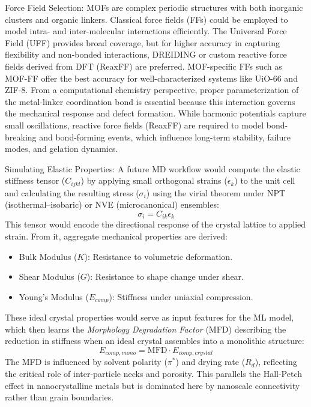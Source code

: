 \documentclass[12pt,a4paper]{article}
\begin{document}
Force Field Selection:  
MOFs are complex periodic structures with both inorganic clusters and organic linkers. Classical force fields (FFs) could be employed to model intra- and inter-molecular interactions efficiently. The Universal Force Field (UFF) provides broad coverage, but for higher accuracy in capturing flexibility and non-bonded interactions, DREIDING or custom reactive force fields derived from DFT (ReaxFF) are preferred. MOF-specific FFs such as MOF-FF offer the best accuracy for well-characterized systems like UiO-66 and ZIF-8.\cite{ref51}  
From a computational chemistry perspective, proper parameterization of the metal-linker coordination bond is essential because this interaction governs the mechanical response and defect formation. While harmonic potentials capture small oscillations, reactive force fields (ReaxFF) are required to model bond-breaking and bond-forming events, which influence long-term stability, failure modes, and gelation dynamics.

Simulating Elastic Properties:  
A future MD workflow would compute the elastic stiffness tensor ($C_{ijkl}$) by applying small orthogonal strains ($\epsilon_k$) to the unit cell and calculating the resulting stress ($\sigma_i$) using the virial theorem under NPT (isothermal–isobaric) or NVE (microcanonical) ensembles:
\[
\sigma_i = C_{ik} \epsilon_k
\]
This tensor would encode the directional response of the crystal lattice to applied strain. From it, aggregate mechanical properties are derived:
\begin{itemize}
    \item Bulk Modulus ($K$): Resistance to volumetric deformation.
    \item Shear Modulus ($G$): Resistance to shape change under shear.
    \item Young's Modulus ($E_{comp}$): Stiffness under uniaxial compression.
\end{itemize}
These ideal crystal properties would serve as input features for the ML model, which then learns the \textit{Morphology Degradation Factor} (MFD) describing the reduction in stiffness when an ideal crystal assembles into a monolithic structure:
\[
E_{comp, mono} = \text{MFD} \cdot E_{comp, crystal}
\]
The MFD is influenced by solvent polarity ($\pi^*$) and drying rate ($R_d$), reflecting the critical role of inter-particle necks and porosity. This parallels the Hall-Petch effect in nanocrystalline metals but is dominated here by nanoscale connectivity rather than grain boundaries.
\end{document}
